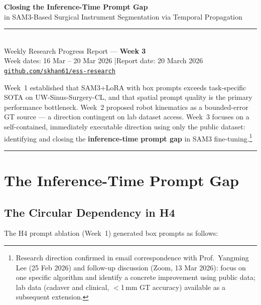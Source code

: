 \documentclass[11pt, a4paper]{article}
\begin{document}
\begin{center}
    {\LARGE \textbf{Closing the Inference-Time Prompt Gap}}\\[0.3em]
    {\large in SAM3-Based Surgical Instrument Segmentation via Temporal Propagation}\\[0.5em]
    \rule{0.5\linewidth}{0.4pt}\\[0.4em]
    {\normalsize Weekly Research Progress Report --- \textbf{Week 3}}\\[0.3em]
    {\normalsize Week dates: 16 Mar -- 20 Mar 2026 \quad|\quad Report date: 20 March 2026}\\[0.3em]
    {\normalsize \href{https://github.com/skhan61/ess-research}{\texttt{github.com/skhan61/ess-research}}}
\end{center}
\vspace{0.5em}

\noindent Week~1 established that SAM3+LoRA with box prompts exceeds task-specific
SOTA on UW-Sinus-Surgery-CL, and that spatial prompt quality is the primary
performance bottleneck.
Week~2 proposed robot kinematics as a bounded-error GT source --- a direction
contingent on lab dataset access.
Week~3 focuses on a self-contained, immediately executable direction using only
the public dataset: identifying and closing the
\textbf{inference-time prompt gap} in SAM3 fine-tuning.\footnote{Research
direction confirmed in email correspondence with Prof.\ Yangming Lee
(25 Feb 2026) and follow-up discussion (Zoom, 13 Mar 2026):
focus on one specific algorithm and identify a concrete improvement
using public data; lab data (cadaver and clinical, $<$1\,mm GT accuracy)
available as a subsequent extension.}

\hrule
\vspace{1em}

\section{The Inference-Time Prompt Gap}

\subsection{The Circular Dependency in H4}

The H4 prompt ablation (Week~1) generated box prompts as follows:
\end{document}
